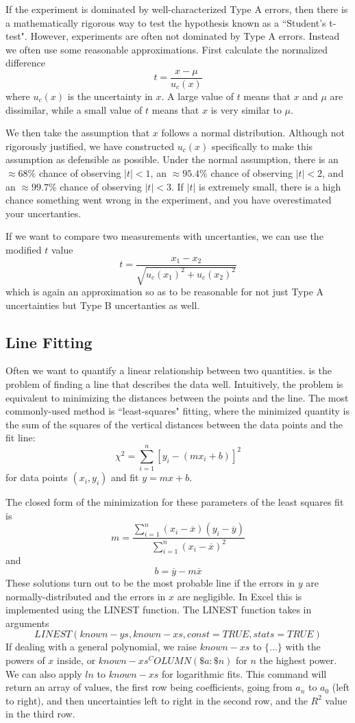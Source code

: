 If the experiment is dominated by well-characterized Type A errors, then there is a mathematically rigorous way to test the hypothesis known as a ``Student's t-test". However, experiments are often not dominated by Type A errors. Instead we often use some reasonable approximations. First calculate the normalized difference $$t = \frac{x-\mu}{u_c(x)}$$ where $u_c(x)$ is the uncertainty in $x$. A large value of $t$ means that $x$ and $\mu$ are dissimilar, while a small value of $t$ means that $x$ is very similar to $\mu$. 

We then take the assumption that $x$ follows a normal distribution. Although not rigorously justified, we have constructed $u_c(x)$ specifically to make this assumption as defensible as possible. Under the normal assumption, there is an $\approx 68\%$ chance of observing $|t| < 1$, an $\approx 95.4\%$ chance of observing $|t| < 2$, and an $\approx 99.7\%$ chance of observing $|t| < 3$. If $|t|$ is extremely small, there is a high chance something went wrong in the experiment, and you have overestimated your uncertanties.

If we want to compare two measurements with uncertanties, we can use the modified $t$ value $$t = \frac{x_1 - x_2}{\sqrt{u_c(x_1)^2+u_c(x_2)^2}}$$ which is again an approximation so as to be reasonable for not just Type A uncertainties but Type B uncertanties as well.


\subsection{Line Fitting}

Often we want to quantify a linear relationship between two quantities.  is the problem of finding a line that describes the data well. Intuitively, the problem is equivalent to minimizing the distances between the points and the line. The most commonly-used method is ``least-squares" fitting, where the minimized quantity is the sum of the squares of the vertical distances between the data points and the fit line: $$\chi^2 = \sum_{i=1}^n[y_i - (mx_i + b)]^2$$ for data points $(x_i,y_i)$ and fit $y = mx+b$.

The closed form of the minimization for these parameters of the least squares fit is $$m = \frac{\sum_{i=1}^n(x_i-\overline{x})(y_i - \overline{y})}{\sum_{i=1}^n(x_i-\overline{x})^2}$$ and $$b = \overline{y} - m\overline{x}$$ These solutions turn out to be the most probable line if the errors in $y$ are normally-distributed and the errors in $x$ are negligible. In Excel this is implemented using the LINEST function. The LINEST function takes in arguments $$LINEST(known-ys,known-xs,const = TRUE,stats = TRUE)$$ If dealing with a general polynomial, we raise $known-xs$ to $\{...\}$ with the powers of $x$ inside, or $known-xs^COLUMN(\$a:\$n)$ for $n$ the highest power. We can also apply $ln$ to $known-xs$ for logarithmic fits. This command will return an array of values, the first row being coefficients, going from $a_n$ to $a_0$ (left to right), and then uncertainties left to right in the second row, and the $R^2$ value in the third row.

